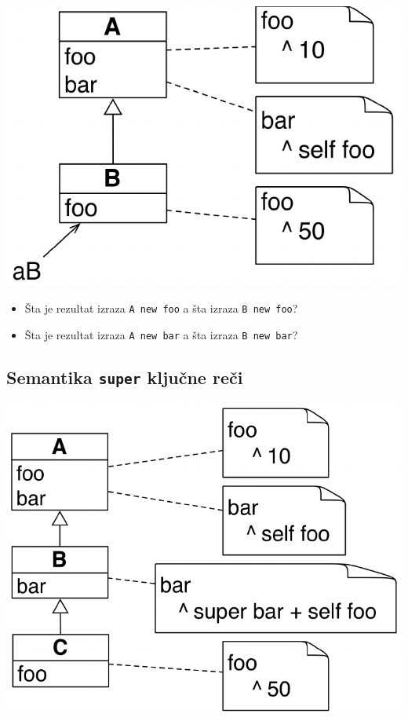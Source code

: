 \documentclass[presentation]{beamer}
\begin{document}
\begin{center}
\includegraphics[width=.9\linewidth]{./slike/self_example.png}
\end{center}

\begin{itemize}
\item Šta je rezultat izraza \texttt{A new foo} a šta izraza \texttt{B new foo}?
\item Šta je rezultat izraza \texttt{A new bar} a šta izraza \texttt{B new bar}?
\end{itemize}

\subsection{Semantika \texttt{super} ključne reči}
\label{sec:orga439f62}

\begin{center}
\includegraphics[width=.9\linewidth]{./slike/super_example.png}
\end{center}
\end{document}
